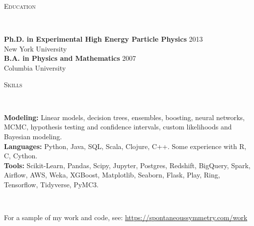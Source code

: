 \documentclass[9pt]{article}
\newenvironment{changemargin}[2]{%
  \begin{list}{}{%
    \setlength{\topsep}{0pt}%
    \setlength{\leftmargin}{#1}%
    \setlength{\rightmargin}{#2}%
    \setlength{\listparindent}{\parindent}%
    \setlength{\itemindent}{\parindent}%
    \setlength{\parsep}{\parskip}%
  }%
  \item[]}{\end{list}
}
\newcommand{\lineover}{
  \begin{changemargin}{-0.05in}{-0.05in}
    \vspace*{-8pt}
    \hrulefill \\
    \vspace*{-2pt}
  \end{changemargin}
}
\newcommand{\header}[1]{
  \begin{changemargin}{-0.5in}{-0.5in}
    \scshape{#1}
    \lineover
  \end{changemargin}
}
\newenvironment{body} {
  \vspace*{-16pt}
\begin{changemargin}{-0.25in}{-0.5in}
  }
{\end{changemargin}
}
\begin{document}
\smallskip

\header{Education}

\begin{body}
  \vspace{14pt}
  \textbf{Ph.D. in Experimental High Energy Particle Physics }{} \hfill 2013{} \\
  New York University \\
  \medskip
  \textbf{B.A. in Physics and Mathematics} \hfill 2007 \\
  Columbia University\\
\end{body}

\header{Skills}
\begin{body}
  \vspace{14pt}
  \textbf{Modeling:}{} Linear models, decision trees, ensembles, boosting, neural networks, MCMC, hypothesis testing and confidence intervals, custom likelihoods and Bayesian modeling. \\
  \textbf{Languages:}{} Python, Java, SQL, Scala, Clojure, C++.  Some experience with R, C, Cython. \\
  \textbf{Tools:}{} Scikit-Learn, Pandas, Scipy, Jupyter, Postgres, Redshift, BigQuery, Spark, Airflow, AWS, Weka, XGBoost, Matplotlib, Seaborn, Flask, Play, Ring, Tensorflow, Tidyverse, PyMC3. \\
\end{body}

\smallskip


\header{}
\begin{body}
  \vspace{14pt}
  For a sample of my work and code, see: {\url{https://spontaneoussymmetry.com/work}}
\end{body}
\end{document}
